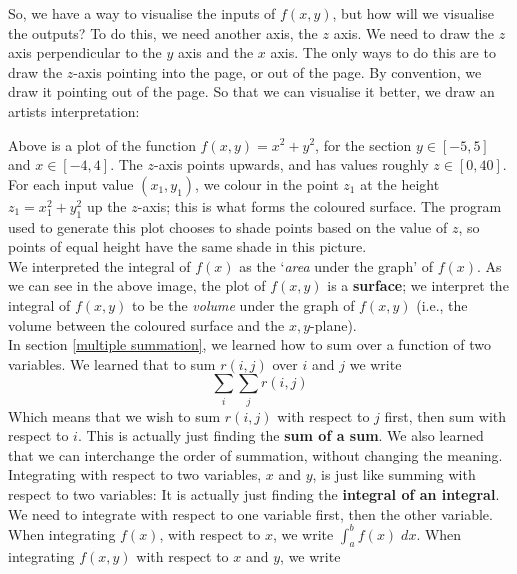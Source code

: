 \noindent So, we have a way to visualise the inputs of $f(x,y)$, but how will we visualise the outputs? To do this, we need another axis, the $z$ axis. We need to draw the $z$ axis perpendicular to the $y$ axis and the $x$ axis. The only ways to do this are to draw the $z$-axis pointing into the page, or out of the page. By convention, we draw it pointing out of the page. So that we can visualise it better, we draw an artists interpretation:
\begin{center}
\end{center}
Above is a plot of the function $f(x,y) = x^2 + y^2$, for the section $y \in [-5,5]$ and $x \in [-4,4]$. The $z$-axis points upwards, and has values roughly $z \in [0,40]$. For each input value $(x_1,y_1)$, we colour in the point $z_1$ at the height $z_1 = x_1^2 + y_1^2$ up the $z$-axis; this is what forms the coloured surface. The program used to generate this plot chooses to shade points based on the value of $z$, so points of equal height have the same shade in this picture. \\

\noindent We interpreted the integral of $f(x)$ as the `\textit{area} under the graph' of $f(x)$. As we can see in the above image, the plot of $f(x,y)$ is a \textbf{surface}; we interpret the integral of $f(x,y)$ to be the \textit{volume} under the graph of $f(x,y)$ (i.e., the volume between the coloured surface and the $x,y$-plane). \\

\noindent In section \ref{multiple summation}, we learned how to sum over a function of two variables. We learned that to sum $r(i,j)$ over $i$ and $j$ we write
\[
\sum_i \sum_j r(i,j) 
\] 
Which means that we wish to sum $r(i,j)$ with respect to $j$ first, then sum with respect to $i$. This is actually just finding the \textbf{sum of a sum}. We also learned that we can interchange the order of summation, without changing the meaning. \\

\noindent Integrating with respect to two variables, $x$ and $y$, is just like summing with respect to two variables: It is actually just finding the \textbf{integral of an integral}. We need to integrate with respect to one variable first, then the other variable. When integrating $f(x)$, with respect to $x$, we write $\int_a^b f(x) \; dx$. When integrating $f(x,y)$ with respect to $x$ and $y$, we write

